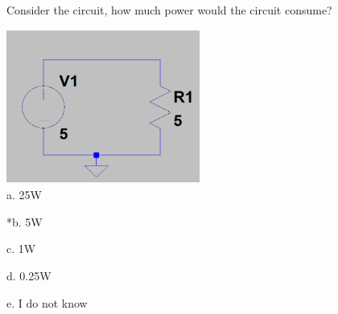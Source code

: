 
Consider the circuit, how much power would the circuit consume?

\includegraphics[width=2.5in,height=2in]{../../Images/OhmsLawQ5.png} \\

a. 25W

*b. 5W

c. 1W

d. 0.25W

e. I do not know \\

